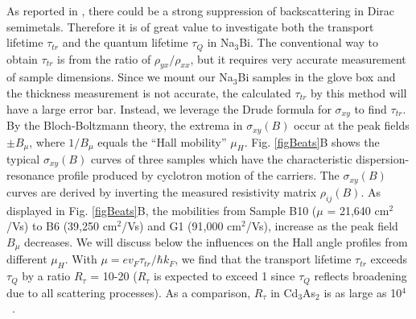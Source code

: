 As reported in \cite{Liang2015}, there could be a strong suppression of backscattering in Dirac semimetals. Therefore it is of great value to investigate both the transport lifetime $\tau_{tr}$ and the quantum lifetime $\tau_Q$ in Na$_3$Bi. The conventional way to obtain $\tau_{tr}$ is from the ratio of $\rho_{yx}/\rho_{xx}$, but it requires very accurate measurement of sample dimensions. Since we mount our Na$_3$Bi samples in the glove box and the thickness measurement is not accurate, the calculated $\tau_{tr}$ by this method will have a large error bar. Instead, we leverage the Drude formula for $\sigma_{xy}$ to find $\tau_{tr}$. By the Bloch-Boltzmann theory, the extrema in $\sigma_{xy}(B)$ occur at the peak fields $\pm B_\mu$, where $1/B_\mu$ equals the ``Hall mobility'' $\mu_H$. Fig. \ref{figBeats}B shows the typical $\sigma_{xy}(B)$ curves of three samples which have the characteristic dispersion-resonance profile produced by cyclotron motion of the carriers. The $\sigma_{xy}(B)$ curves are derived by inverting the measured resistivity matrix $\rho_{ij}(B)$. As displayed in Fig. \ref{figBeats}B, the mobilities from Sample B10 ($\mu$ = 21,640 cm$^2$/Vs) to B6 (39,250 cm$^2$/Vs) and G1 (91,000 cm$^2$/Vs), increase as the peak field $B_{\mu}$ decreases. We will discuss below the influences on the Hall angle profiles from different $\mu_H$. With $\mu = ev_F\tau_{tr}/\hbar k_F$, we find that the transport lifetime $\tau_{tr}$ exceeds $\tau_Q$ by a ratio $R_{\tau}$ = 10-20 ($R_{\tau}$ is expected to exceed 1 since $\tau_Q$ reflects broadening due to all scattering processes). As a comparison, $R_{\tau}$ in Cd$_3$As$_2$ is as large as 10$^4$~\cite{Liang2015}. 




